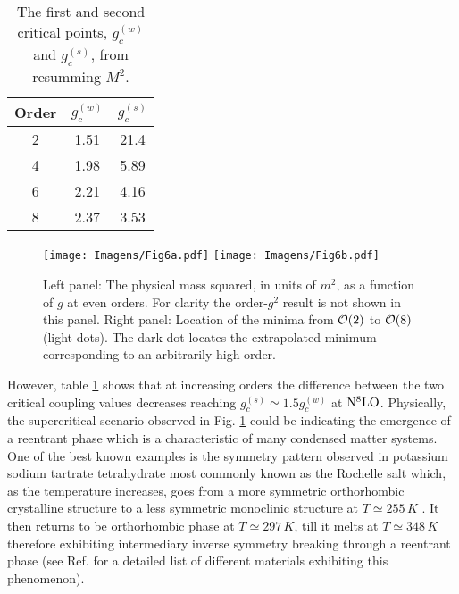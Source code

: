 \documentclass[a4paper,11pt]{article}
\begin{document}
\begin{table}[ht!]
    \centering
        \begin{tabular}{ |c|c|c|  }
            \hline
            Order  & $g_c^{(w)}$ & $g_c^{(s)}$ \\
            \hline
            2 & 1.51 & 21.4 \\ 
            4 & 1.98 & 5.89 \\
            6 & 2.21 & 4.16 \\
            8 & 2.37 & 3.53 \\ \hline
        \end{tabular}
    \caption{The first and second critical points, $g_c^{(w)}$ and $g_c^{(s)}$, from resumming $M^2$. }
 \label{tabela3}   
\end{table}
\begin{figure}[ht!]
    \centering
    \texttt{[image: Imagens/Fig6a.pdf]}
    \qquad
     \texttt{[image: Imagens/Fig6b.pdf]}
    \caption{Left panel: The  physical mass squared, in units of $m^2$,  as a function of $g$ at even orders. For clarity the order-$g^2$ result is not shown in this panel. Right panel: Location of the minima from ${\cal O}(2)$ to ${\cal O}(8)$ (light dots).  The dark dot locates the extrapolated minimum corresponding to an arbitrarily high order.}
    \label{Fig6}
\end{figure}
However, table \ref{tabela3} shows that at increasing orders the difference between the two critical coupling values decreases reaching  $g_c^{(s)} \simeq 1.5 g_c^{(w)}$ at ${\rm N}^8{\rm LO}$.  Physically, the supercritical scenario observed in Fig. \ref{Fig6} could be indicating the emergence of a reentrant phase which is a characteristic of many condensed matter systems.  One of the best known examples is the symmetry pattern observed in potassium sodium tartrate tetrahydrate most commonly known as the Rochelle salt which, as the temperature increases, goes   from a more symmetric orthorhombic crystalline structure to a less symmetric monoclinic structure at $T\simeq 255\, K$ \cite{ISB}. It then returns to be orthorhombic phase at $T\simeq 297 \,K$, till it melts at $T\simeq 348\,K$   therefore exhibiting  intermediary inverse symmetry breaking through a reentrant phase (see  Ref. \cite{condmatt} for a detailed list of different materials exhibiting this phenomenon).
\end{document}
